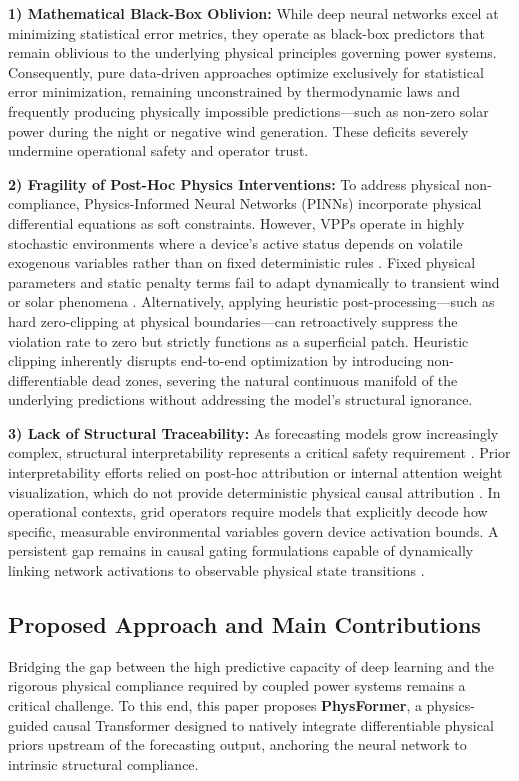\textbf{1) Mathematical Black-Box Oblivion:} While deep neural networks excel at minimizing statistical error metrics, they operate as black-box predictors that remain oblivious to the underlying physical principles governing power systems. Consequently, pure data-driven approaches optimize exclusively for statistical error minimization, remaining unconstrained by thermodynamic laws and frequently producing physically impossible predictions---such as non-zero solar power during the night or negative wind generation. These deficits severely undermine operational safety and operator trust.

\textbf{2) Fragility of Post-Hoc Physics Interventions:} To address physical non-compliance, Physics-Informed Neural Networks (PINNs) \cite{Raissi2019} incorporate physical differential equations as soft constraints. However, VPPs operate in highly stochastic environments where a device's active status depends on volatile exogenous variables rather than on fixed deterministic rules \cite{Li2026}. Fixed physical parameters and static penalty terms fail to adapt dynamically to transient wind or solar phenomena \cite{Asinyo2025}. Alternatively, applying heuristic post-processing---such as hard zero-clipping at physical boundaries---can retroactively suppress the violation rate to zero but strictly functions as a superficial patch. Heuristic clipping inherently disrupts end-to-end optimization by introducing non-differentiable dead zones, severing the natural continuous manifold of the underlying predictions without addressing the model's structural ignorance.

\textbf{3) Lack of Structural Traceability:} As forecasting models grow increasingly complex, structural interpretability represents a critical safety requirement \cite{Vle2025}. Prior interpretability efforts relied on post-hoc attribution or internal attention weight visualization, which do not provide deterministic physical causal attribution \cite{Lovo2025}. In operational contexts, grid operators require models that explicitly decode how specific, measurable environmental variables govern device activation bounds. A persistent gap remains in causal gating formulations capable of dynamically linking network activations to observable physical state transitions \cite{Song2025,Chen2024}.

\subsection{Proposed Approach and Main Contributions}
Bridging the gap between the high predictive capacity of deep learning and the rigorous physical compliance required by coupled power systems remains a critical challenge. To this end, this paper proposes \textbf{PhysFormer}, a physics-guided causal Transformer designed to natively integrate differentiable physical priors upstream of the forecasting output, anchoring the neural network to intrinsic structural compliance.

